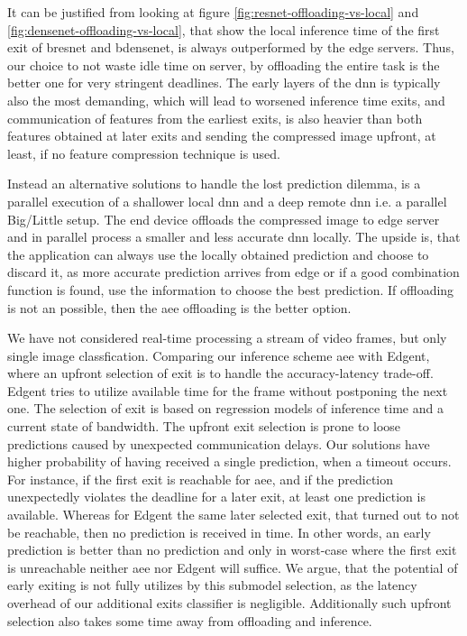 It can be justified from looking at figure \ref{fig:resnet-offloading-vs-local} and \ref{fig:densenet-offloading-vs-local}, that show the local inference time of the first exit of \gls{bresnet} and \gls{bdensenet}, is always outperformed by the edge servers. Thus, our choice to not waste idle time on server, by offloading the entire task is the better one for very stringent deadlines. The early layers of the \gls{dnn} is typically also the most demanding, which will lead to worsened inference time exits, and communication of features from the earliest exits, is also heavier than both  features obtained at later exits and sending the compressed image upfront, at least, if no feature compression technique is used.

Instead an alternative solutions to handle the lost prediction dilemma, is a parallel execution of a shallower local \gls{dnn} and a deep remote \gls{dnn} i.e. a parallel Big/Little setup. The end device offloads the compressed image to edge server and in parallel process a smaller and less accurate \gls{dnn} locally. The upside is, that the application can always use the locally obtained prediction and choose to discard it, as more accurate prediction arrives from edge or if a good combination function is found, use the information to choose the best prediction. If offloading is not an possible, then the \gls{aee} offloading is the better option.

We have not considered real-time processing a stream of video frames, but only single image classfication. Comparing our inference scheme \gls{aee} with Edgent, where an upfront selection of exit is to handle the accuracy-latency trade-off. Edgent tries to utilize available time for the frame without postponing the next one. The selection of exit is based on regression models of inference time and a current state of bandwidth. The upfront exit selection is prone to loose predictions caused by unexpected communication delays. Our solutions have higher probability of having received a single prediction, when a timeout occurs. For instance, if the first exit is reachable for \gls{aee}, and if the prediction unexpectedly violates the deadline for a later exit, at least one prediction is available. Whereas for Edgent the same later selected exit, that turned out to not be reachable, then no prediction is received in time. In other words, an early prediction is better than no prediction and only in worst-case where the first exit is unreachable neither \gls{aee} nor Edgent will suffice. We argue, that the potential of early exiting is not fully utilizes by this submodel selection, as the latency overhead of our additional exits classifier is negligible. Additionally such upfront selection also takes some time away from offloading and inference.

